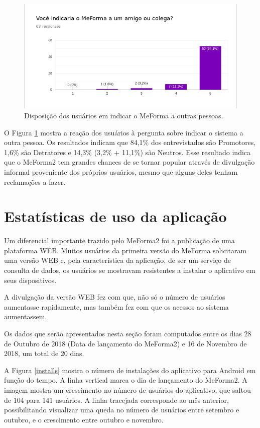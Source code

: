 \begin{figure}[H]
	   \centering
	   		\includegraphics[scale=0.65]{pics/c5/3-share.png}
	   \caption{Disposição dos usuários em indicar o MeForma a outras pessoas.}
	   \label{nps}
\end{figure}

O Figura \ref{nps} mostra a reação dos usuários à pergunta sobre indicar o sistema a outra pessoa. Os resultados indicam que 84,1\% dos entrevistados são Promotores, 1,6\% são Detratores e 14,3\% (3,2\% + 11,1\%) são Neutros. Esse resultado indica que o MeForma2 tem grandes chances de se tornar popular através de divulgação informal proveniente dos próprios usuários, mesmo que alguns deles tenham reclamações a fazer.

\section{Estatísticas de uso da aplicação}

Um diferencial importante trazido pelo MeForma2 foi a publicação de uma plataforma WEB. Muitos usuários da primeira versão do MeForma solicitaram uma versão WEB e, pela característica da aplicação, de ser um serviço de consulta de dados, os usuários se mostravam resistentes a instalar o aplicativo em seus dispositivos.

A divulgação da versão WEB fez com que, não só o número de usuários aumentasse rapidamente, mas também fez com que os acessos ao sistema aumentassem.

Os dados que serão apresentados nesta seção foram computados entre os dias 28 de Outubro de 2018 (Data de lançamento do MeForma2) e 16 de Novembro de 2018, um total de 20 dias.

A Figura \ref{installs} mostra o número de instalações do aplicativo para Android em função do tempo. A linha vertical marca o dia de lançamento do MeForma2. A imagem mostra um crescimento no número de usuários do aplicativo, que saltou de 104 para 141 usuários. A linha tracejada corresponde ao mês anterior, possibilitando visualizar uma queda no número de usuários entre setembro e outubro, e o crescimento entre outubro e novembro.   

